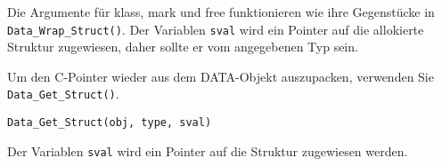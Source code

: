 \noindent Die Argumente für klass, mark und free funktionieren wie
ihre Gegenstücke in \verb+Data_Wrap_Struct()+. Der Variablen
\verb+sval+ wird ein Pointer auf die allokierte Struktur zugewiesen,
daher sollte er vom angegebenen Typ sein.

Um den C-Pointer wieder aus dem DATA-Objekt auszupacken, verwenden Sie
\verb+Data_Get_Struct()+.

\begin{lstlisting}
Data_Get_Struct(obj, type, sval)
\end{lstlisting}

\noindent Der Variablen \verb+sval+ wird ein Pointer auf die Struktur
zugewiesen werden.

